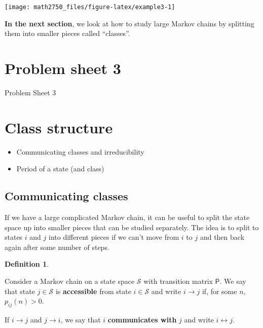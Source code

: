\documentclass[
  a4paper,
]{article}
\providecommand{\tightlist}{%
  \setlength{\itemsep}{0pt}\setlength{\parskip}{0pt}}
\theoremstyle{definition}
\newtheorem{definition}{Definition}[section]
\theoremstyle{definition}
\theoremstyle{definition}
\theoremstyle{remark}
\begin{document}
\begin{center}\texttt{[image: math2750\_files/figure-latex/example3-1]} \end{center}

\textbf{In the next section}, we look at how to study large Markov chains by splitting them into smaller pieces called ``classes''.

\hypertarget{P03}{%
\section*{Problem sheet 3}\label{P03}}

Problem Sheet 3

\hypertarget{S07-classes}{%
\section{Class structure}\label{S07-classes}}

\begin{itemize}
\tightlist
\item
  Communicating classes and irreducibility
\item
  Period of a state (and class)
\end{itemize}

\hypertarget{comm-classes}{%
\subsection{Communicating classes}\label{comm-classes}}

If we have a large complicated Markov chain, it can be useful to split the state space up into smaller pieces that can be studied separately. The idea is to split to states \(i\) and \(j\) into different pieces if we can't move from \(i\) to \(j\) and then back again after some number of steps.

\begin{definition}
\protect\hypertarget{def:comm}{}\label{def:comm}

Consider a Markov chain on a state space \(\mathcal S\) with transition matrix \(\mathsf P\). We say that state \(j\in\mathcal{S}\) is \textbf{accessible} from state \(i\in\mathcal{S}\) and write \(i \to j\) if, for some \(n\), \(p_{ij}(n)>0\).

If \(i \to j\) and \(j \to i\), we say that \(i\) \textbf{communicates with} \(j\) and write \(i \leftrightarrow j\).

\end{definition}
\end{document}
